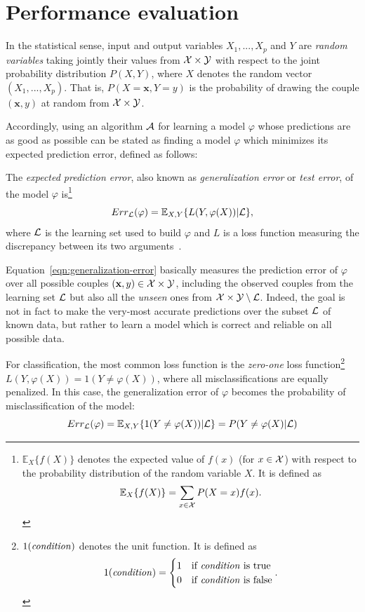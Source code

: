 \section{Performance evaluation}

In the statistical sense, input and output variables $X_1, ..., X_p$ and $Y$
are \textit{random variables} taking jointly their values from ${\cal X}
\times {\cal Y}$ with respect to the joint probability distribution $P(X, Y)$,
where $X$ denotes the random vector $(X_1, ..., X_p)$. That is,
$P(X=\mathbf{x}, Y=y)$ is the probability of drawing the couple $(\mathbf{x},
y)$ at random from ${\cal X} \times {\cal Y}$.

Accordingly, using an algorithm ${\cal A}$ for learning a model $\varphi$ whose
predictions are as good as possible can be stated as finding a model $\varphi$
which minimizes its expected prediction error, defined as follows:

\begin{definition}
The \emph{expected prediction error}, also known as \emph{generalization
error} or \emph{test error}, of the model $\varphi$ is\footnote{$\mathbb{E}_X \{f(X)\}$ denotes the expected value of $f(x)$
(for $x \in {\cal X}$) with respect to the probability distribution of the
random variable $X$. It is defined as $$\mathbb{E}_X \{f(X)\} = \sum_{x \in {\cal
X}} P(X=x) f(x).$$}
\begin{equation}\label{eqn:generalization-error}
Err_{{\cal L}}(\varphi) = \mathbb{E}_{X, Y}\{ L(Y, \varphi(X)) | {\cal L} \},
\end{equation}
where ${\cal L}$ is the learning set used to build $\varphi$ and $L$ is a loss
function measuring the discrepancy between its two
arguments~\citep{geurts:2002}.
\end{definition}

Equation~\ref{eqn:generalization-error} basically measures the prediction error of $\varphi$ over all
possible couples $(\mathbf{x}, y)\in {\cal X}\times{\cal Y}$, including the
observed couples from the learning set ${\cal L}$ but also all the
\textit{unseen} ones from ${\cal X}\times{\cal Y} \setminus {\cal L}$. Indeed,
the goal is not in fact to make the very-most accurate predictions over the
subset ${\cal L}$ of known data, but rather to learn a model which is correct
and reliable on all possible data.

For classification, the most common loss function is the \textit{zero-one} loss
function\footnote{$1(\text{\textit{condition}})$ denotes the unit function. It
is defined as
$$1(\text{\textit{condition}}) =
\begin{cases}
1 & \text{if \textit{condition} is true}\\
0 & \text{if \textit{condition} is false}
\end{cases}.
$$} $L(Y, \varphi(X)) = 1(Y \neq \varphi(X))$, where all
misclassifications are equally penalized. In this case, the generalization
error of $\varphi$ becomes the probability of misclassification of the model:
\begin{equation}
Err_{\cal L}(\varphi) = \mathbb{E}_{X, Y}\{ 1(Y \neq \varphi(X)) | {\cal L} \} = P(Y \neq \varphi(X)|{\cal L})
\end{equation}

